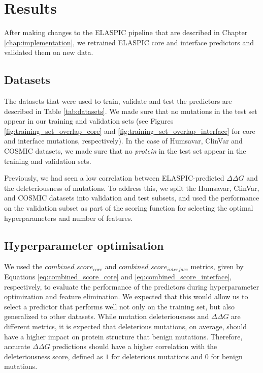 
\chapter{Results} \label{chap:results}

After making changes to the ELASPIC pipeline that are described in Chapter \ref{chap:implementation}, we retrained ELASPIC core and interface predictors and validated them on new data.


\section{Datasets}

The datasets that were used to train, validate and test the predictors are described in Table \ref{tab:datasets}. We made sure that no mutations in the test set appear in our training and validation sets (see Figures \ref{fig:training_set_overlap_core} and \ref{fig:training_set_overlap_interface} for core and interface mutations, respectively). In the case of Humsavar, ClinVar and COSMIC datasets, we made sure that no \textit{protein} in the test set appear in the training and validation sets.

Previously, we had seen a low correlation between ELASPIC-predicted $\Delta \Delta G$ and the deleteriousness of mutations. To address this, we split the Humsavar, ClinVar, and COSMIC datasets into validation and test subsets, and used the performance on the validation subset as part of the scoring function for selecting the optimal hyperparameters and number of features.


\section{Hyperparameter optimisation}

We used the $combined\_score_{core}$ and $combined\_score_{interface}$ metrics, given by Equations \ref{eq:combined_score_core} and \ref{eq:combined_score_interface}, respectively, to evaluate the performance of the predictors during hyperparameter optimization and feature elimination. We expected that this would allow us to select a predictor that performs well not only on the training set, but also generalized to other datasets. While mutation deleteriousness and $\Delta \Delta G$ are different metrics, it is expected that deleterious mutations, on average, should have a higher impact on protein structure that benign mutations. Therefore, accurate $\Delta \Delta G$ predictions should have a higher correlation with the deleteriousness score, defined as $1$ for deleterious mutations and $0$ for benign mutations.

